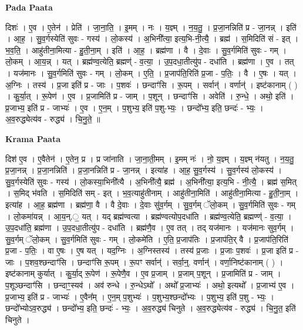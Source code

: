 \documentclass[17pt]{extarticle}
\begin{document}
\textbf{Pada Paata} \newline

दिशः॑ । ए॒व । ए॒तेन॑ । प्रेति॑ । जा॒ना॒ति॒ । इ॒मम् । नः । य॒ज्ञ्म् । न॒य॒तु॒ । प्र॒जा॒नन्निति॑ प्र - जा॒नन्न् । इति॑ । आ॒ह॒ । सु॒व॒र्गस्येति॑ सुवः - गस्य॑ । लो॒कस्य॑ । अ॒भिनी᳚त्या॒ इत्य॒भि-नी॒त्यै॒ । ब्रह्म॑ । स॒मिदिति॑ सं - इत् । भ॒व॒ति॒ । आहु॑तीना॒मित्या - हु॒ती॒ना॒म् । इति॑ । आ॒ह॒ । ब्रह्म॑णा । वै । दे॒वाः । सु॒व॒र्गमिति॑ सुवः - गम् । लो॒कम् । आ॒य॒न्न् । यत् । ब्रह्म॑ण्व॒त्येति॒ ब्रह्मण्॑ - व॒त्या॒ । उ॒प॒दधा॒तीत्यु॑प - दधा॑ति । ब्रह्म॑णा । ए॒व । तत् । यज॑मानः । सु॒व॒र्गमिति॑ सुवः - गम् । लो॒कम् । ए॒ति॒ । प्र॒जाप॑ति॒रिति॑ प्र॒जा - प॒तिः॒ । वै । ए॒षः । यत् । अ॒ग्निः । तस्य॑ । प्र॒जा इति॑ प्र - जाः । प॒शवः॑ । छन्दाꣳ॑सि । रू॒पम् । सर्वान्॑ । वर्णान्॑ । इष्ट॑कानाम् ( ) । कु॒र्या॒त् । रू॒पेण॑ । ए॒व । प्र॒जामिति॑ प्र - जाम् । प॒शून् । छन्दाꣳ॑सि । अवेति॑ । रु॒न्धे॒ । अथो॒ इति॑ । प्र॒जाभ्य॒ इति॑ प्र - जाभ्यः॑ । ए॒व । ए॒न॒म् । प॒शुभ्य॒ इति॑ प॒शु-भ्यः॒ । छन्दो᳚भ्य॒ इति॒ छन्दः॑ - भ्यः॒ । अ॒व॒रुद्ध्येत्य॑व - रुद्ध्य॑ । चि॒नु॒ते॒ ॥  \newline


\textbf{Krama Paata} \newline

दिश॑ ए॒व । ए॒वैतेन॑ । ए॒तेन॒ प्र । प्र जा॑नाति । जा॒ना॒ती॒मम् । इ॒मम् नः॑ । नो॒ य॒ज्ञ्म् । य॒ज्ञ्म् न॑यतु । न॒य॒तु॒ प्र॒जा॒नन्न् । प्र॒जा॒नन्निति॑ । प्र॒जा॒नन्निति॑ प्र - जा॒नन्न् । इत्या॑ह । आ॒ह॒ सु॒व॒र्गस्य॑ । सु॒व॒र्गस्य॑ लो॒कस्य॑ । सु॒व॒र्गस्येति॑ सुवः - गस्य॑ । लो॒कस्या॒भिनी᳚त्यै । अ॒भिनी᳚त्यै॒ ब्रह्म॑ । अ॒भिनी᳚त्या॒ इत्य॒भि - नी॒त्यै॒ । ब्रह्म॑ स॒मित् । स॒मिद् भ॑वति । स॒मिदिति॑ सम् - इत् । भ॒व॒त्याहु॑तीनाम् । आहु॑तीना॒मिति॑ । आहु॑तीना॒मित्या - हु॒ती॒ना॒म् । इत्या॑ह । आ॒ह॒ ब्रह्म॑णा । ब्रह्म॑णा॒ वै । वै दे॒वाः । दे॒वाः सु॑व॒र्गम् । सु॒व॒र्गम् ॅलो॒कम् । सु॒व॒र्गमिति॑ सुवः - गम् । लो॒कमा॑यन्न् । आ॒य॒न्.॒ यत् । यद् ब्रह्म॑ण्वत्या । ब्रह्म॑ण्वत्योप॒दधा॑ति । ब्रह्म॑ण्व॒त्येति॒ ब्रह्मण्ण्॑ - व॒त्या॒ । उ॒प॒दधा॑ति॒ ब्रह्म॑णा । उ॒प॒दधा॒तीत्यु॑प - दधा॑ति । ब्रह्म॑णै॒व । ए॒व तत् । तद् यज॑मानः । यज॑मानः सुव॒र्गम् । सु॒व॒र्गम् ॅलो॒कम् । सु॒व॒र्गमिति॑ सुवः - गम् । लो॒कमे॑ति । ए॒ति॒ प्र॒जाप॑तिः । प्र॒जाप॑ति॒र् वै । प्र॒जाप॑ति॒रिति॑ प्र॒जा - प॒तिः॒ । वा ए॒षः । ए॒ष यत् । यद॒ग्निः । अ॒ग्निस्तस्य॑ । तस्य॑ प्र॒जाः । प्र॒जाः प॒शवः॑ । प्र॒जा इति॑ प्र - जाः । प॒शव॒श्छन्दाꣳ॑सि । छन्दाꣳ॑सि रू॒पम् । रू॒पꣳ सर्वान्॑ । सर्वा॒न्॒. वर्णान्॑ । वर्णा॒निष्ट॑कानाम् ( ) । इष्ट॑कानाम् कुर्यात् । कु॒र्या॒द् रू॒पेण॑ । रू॒पेणै॒व । ए॒व प्र॒जाम् । प्र॒जाम् प॒शून् । प्र॒जामिति॑ प्र - जाम् । प॒शूञ्छन्दाꣳ॑सि । छन्दाꣳ॒॒स्यव॑ । अव॑ रुन्धे । रु॒न्धेऽथो᳚ । अथो᳚ प्र॒जाभ्यः॑ । अथो॒ इत्यथो᳚ । प्र॒जाभ्य॑ ए॒व । प्र॒जाभ्य॒ इति॑ प्र - जाभ्यः॑ । ए॒वैन᳚म् । ए॒न॒म् प॒शुभ्यः॑ । प॒शुभ्य॒श्छन्दो᳚भ्यः । प॒शुभ्य॒ इति॑ प॒शु - भ्यः॒ । छन्दो᳚भ्योऽव॒रुद्ध्य॑ । छन्दो᳚भ्य॒ इति॒ छन्दः॑ - भ्यः॒ । अ॒व॒रुद्ध्य॑ चिनुते । अ॒व॒रुद्ध्येत्य॑व - रुद्ध्य॑ । चि॒नु॒त॒ इति॑ चिनुते । \newline
\end{document}
